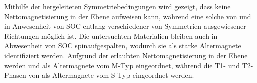Mithilfe der hergeleiteten Symmetriebedingungen wird gezeigt, dass  keine Nettomagnetisierung in der Ebene aufweisen kann, während eine solche von  und  in Anwesenheit von SOC entlang verschiedener von Symmetrien ausgewiesener Richtungen möglich ist. 
Die untersuchten Materialien bleiben auch in Abwesenheit von SOC spinaufgespalten, wodurch sie als starke Altermagnete identifiziert werden. Aufgrund der erlaubten Nettomagnetisierung in der Ebene werden  und  als Altermagnete vom M-Typ eingeordnet, während die T1- und T2-Phasen von  als Altermagnete vom S-Typ eingeordnet werden.